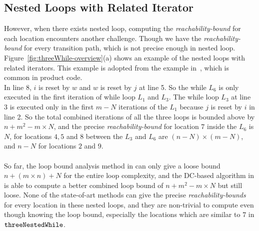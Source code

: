 \subsection{Nested Loops with Related Iterator}
\label{sec:overview-nestedwhile}
However, when there exists nested loop, computing the \emph{reachability-bound} for each location encounters another challenge.
Though we have
the \emph{reachability-bound} for every transition path, which is not precise enough in nested loop.
Figure~\ref{fig:threeWhile-overview}(a) shows an example of the nested loops with related 
iterators.
This example is adopted from the example in~\cite{GulwaniJK09}, which is common in product code.
\\
In line 8, $i$ is reset by $w$ and $w$ is reset by $j$ at line 5. So the
while $L_6$ is only executed in the first iteration of while loop $L_1$ and $L_3$.
The while loop $L_3$ at line 3 is executed only in 
the first $m - N$ iterations of the 
$L_1$ because $j$ is reset by $i$ in line 2.
So the total combined iterations of all the three loops is bounded above by 
$n + m^2 - m \times N$,
and the precise \emph{reachability-bound} for location $7$ inside the $L_6$ is $N$,
for locations $4, 5$ and $8$ between the $L_3$ and $L_6$ are $(n-N) \times (m - N)$,
and $n - N$ for locations $2$ and $9$.
\\
\\
So far, the loop bound analysis method in \cite{GulwaniJK09} can only give a loose bound $n + (m \times n) + N$ for the entire loop complexity, and 
the DC-based algorithm in \cite{sinn2017complexity} is able to
compute a better combined loop bound of $n + m^2 - m \times N$ but still loose.
None of the state-of-art methods can give the precise \emph{reachability-bounds} for every location in these nested loops,
and they are non-trivial to compute even though knowing the loop bound,
especially the locations which are similar to $7$ in $\mathtt{threeNestedWhile}$.
\\
